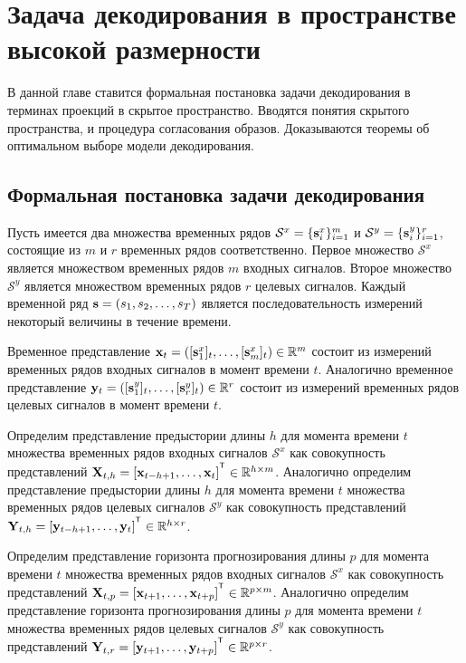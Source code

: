 \chapter{Задача декодирования в пространстве высокой размерности}
\label{ch:pls}

В данной главе ставится формальная постановка задачи декодирования в терминах проекций в скрытое пространство. 
Вводятся понятия скрытого пространства, и процедура согласования образов.
Доказываются теоремы об оптимальном выборе модели декодирования.

\section{Формальная постановка задачи декодирования}

\hrulefill

Пусть имеется два множества временных рядов $\mathcal{S}^x = \{\mathbf{s}^x_i\}_{i=1}^m$ и $\mathcal{S}^y = \{\mathbf{s}^y_i\}_{i=1}^r$, состоящие из $m$ и $r$ временных рядов соответственно. 
Первое множество $\mathcal{S}^x$ является множеством временных рядов $m$ входных сигналов. 
Второе множество $\mathcal{S}^y$ является множеством временных рядов $r$ целевых сигналов.
Каждый временной ряд $\mathbf{s} = (s_1, s_2, \dots, s_T)$ является последовательность измерений некоторый величины в течение времени. 
\begin{definition}
	Временное представление $\mathbf{x}_t = ([\mathbf{s}^x_1]_t, \dots, [\mathbf{s}^x_m]_t) \in \mathbb{R}^m$ состоит из измерений временных рядов входных сигналов в момент времени $t$. 
	Аналогично временное представление $\mathbf{y}_t = ([\mathbf{s}^y_1]_t, \dots, [\mathbf{s}^y_r]_t) \in \mathbb{R}^r$ состоит из измерений временных рядов целевых сигналов в момент времени $t$.
\end{definition}
\begin{definition}
	Определим представление предыстории длины $h$ для момента времени $t$ множества временных рядов входных сигналов $\mathcal{S}^x$ как совокупность представлений $\bX_{t,h} = [\bx_{t - h + 1}, \dots, \bx_{t}]^{\T} \in \bbR^{h \times m}$.
	Аналогично определим представление предыстории длины $h$ для момента времени $t$ множества временных рядов целевых сигналов $\mathcal{S}^y$ как совокупность представлений $\bY_{t,h} = [\by_{t - h + 1}, \dots, \by_{t}]^{\T} \in \bbR^{h \times r}$.
\end{definition}
\begin{definition}
	Определим представление горизонта прогнозирования длины $p$ для момента времени $t$ множества временных рядов входных сигналов $\mathcal{S}^x$ как совокупность представлений $\bX_{t,p} = [\bx_{t + 1}, \dots, \bx_{t + p}]^{\T} \in \bbR^{p \times m}$.
	Аналогично определим представление горизонта прогнозирования длины $p$ для момента времени $t$ множества временных рядов целевых сигналов $\mathcal{S}^y$ как совокупность представлений $\bY_{t,r} = [\by_{t + 1}, \dots, \by_{t + p}]^{\T} \in \bbR^{p \times r}$.
\end{definition}

